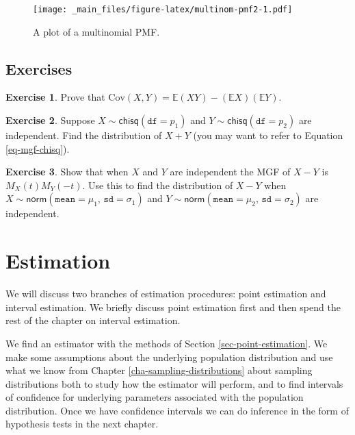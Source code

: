 \documentclass[]{book}
\numberwithin{equation}{chapter}
\numberwithin{figure}{chapter}
\theoremstyle{plain}
\theoremstyle{definition}
\newtheorem{xca}{Exercise}[chapter]
\theoremstyle{remark}
\theoremstyle{definition}
\theoremstyle{definition}
\theoremstyle{remark}
\begin{document}
\begin{figure}[htbp]
\centering
\texttt{[image: \_main\_files/figure-latex/multinom-pmf2-1.pdf]}
\caption{\label{fig:multinom-pmf2}\small A plot of a multinomial PMF.}
\end{figure}



\section{Exercises}\label{exercises-5}

\begin{xca}
Prove that
\(\mbox{Cov}(X,Y)=\mathbb{E}(XY)-(\mathbb{E} X)(\mathbb{E} Y).\)
\end{xca}

\bigskip

\begin{xca}
Suppose \(X\sim\mathsf{chisq}(\mathtt{df}=p_{1})\) and
\(Y\sim\mathsf{chisq}(\mathtt{df}=p_{2})\) are independent. Find the
distribution of \(X+Y\) (you may want to refer to Equation
\eqref{eq-mgf-chisq}).
\end{xca}

\bigskip

\begin{xca}
Show that when \(X\) and \(Y\) are independent the MGF of \(X-Y\) is
\(M_{X}(t)M_{Y}(-t)\). Use this to find the distribution of \(X-Y\) when
\(X\sim\mathsf{norm}(\mathtt{mean}=\mu_{1},\,\mathtt{sd}=\sigma_{1})\)
and
\(Y\sim\mathsf{norm}(\mathtt{mean}=\mu_{2},\,\mathtt{sd}=\sigma_{2})\)
are independent.
\end{xca}

\chapter{Estimation}\label{cha-estimation}

We will discuss two branches of estimation procedures: point estimation
and interval estimation. We briefly discuss point estimation first and
then spend the rest of the chapter on interval estimation.

We find an estimator with the methods of Section
\ref{sec-point-estimation}. We make some assumptions about the
underlying population distribution and use what we know from Chapter
\ref{cha-sampling-distributions} about sampling distributions both to
study how the estimator will perform, and to find intervals of
confidence for underlying parameters associated with the population
distribution. Once we have confidence intervals we can do inference in
the form of hypothesis tests in the next chapter.
\end{document}
